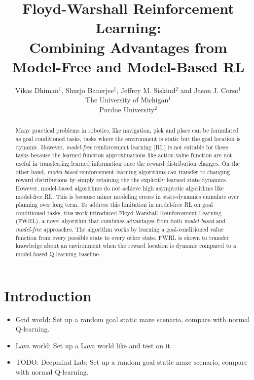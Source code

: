 \documentclass[letterpaper]{article} %
\title{Floyd-Warshall Reinforcement Learning: \\Combining Advantages from
Model-Free and Model-Based RL}
\author{Vikas Dhiman$^1$, Shurjo Banerjee$^1$, Jeffrey M. Siskind$^2$ and Jason J.
Corso$^1$\\
The University of Michigan$^1$\\
Purdue University$^2$}
\newcommand{\TODO}[1]{{\color{red}TODO: {#1}}}
\begin{document}
\maketitle
\begin{abstract}
Many practical problems in robotics, like navigation, pick and place can be
formulated as goal conditioned tasks, tasks where the environment is static but
the goal location is dynamic.
However, \emph{model-free} reinforcement learning (RL) is not suitable for these
tasks because the learned function approximations like action-value function are
not useful in transferring learned information once the reward distribution
changes.
On the other hand, \emph{model-based} reinforcement learning algorithms can
transfer to changing reward distributions by simply retaining the the
explicitly learned state-dynamics. However, model-based algorithms do not
achieve high asymptotic algorithms like model-free RL. This is because minor
modeling errors in state-dynamics cumulate over planning over long term.
To address this limitation in model-free RL on goal conditioned tasks, 
this work introduced Floyd-Warshall Reinforcement Learning (FWRL), a novel
algorithm that combines advantages from both \emph{model-based} and
\emph{model-free} approaches.
The algorithm works by learning a goal-conditioned value function from every
possible state to every other state.
FWRL is shown to transfer knowledge about an environment when the reward
location is dynamic compared to a model-based Q-learning baseline.
\end{abstract}


\section{ Introduction}



%













%



\begin{itemize}
    \item Grid world: Set up a random goal static maze scenario, compare with normal Q-learning.
    \item Lava world: Set up a Lava world like \cite{schaul2015universal} and test on it.
    \item \TODO{Deepmind Lab}: Set up a random goal static maze scenario, compare with normal Q-learning. 
\end{itemize}



\def\localbib{/home/dhiman/wrk/group-bib/shared}
\IfFileExists{\localbib.bib}{
}{
}

\end{document}

